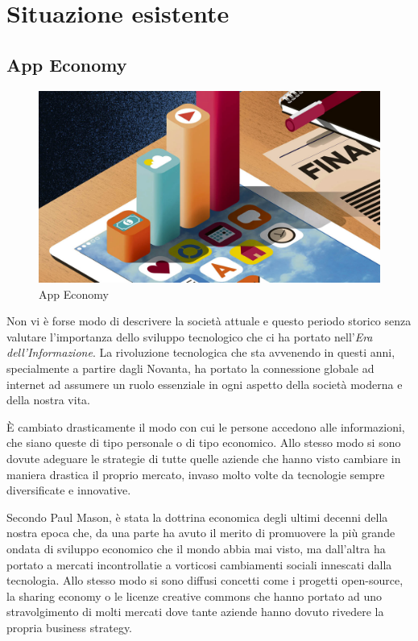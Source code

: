 \section{Situazione esistente}

\subsection{App Economy}
  
\begin{figure}[h!]
  \includegraphics[width=\linewidth]{images/The-App-Economy.jpg}
  \caption{App Economy}
  \label{fig:appEconomy1}
\end{figure}
  
Non vi è forse modo di descrivere la società attuale e questo periodo storico senza valutare l'importanza dello sviluppo tecnologico che ci ha portato nell'\textit{Era dell'Informazione}.
La rivoluzione tecnologica che sta avvenendo in questi anni, specialmente a partire dagli Novanta, ha portato la connessione globale ad internet ad assumere un ruolo essenziale in ogni aspetto della società moderna e della nostra vita.

È cambiato drasticamente il modo con cui le persone accedono alle informazioni, che siano queste di tipo personale o di tipo economico.
Allo stesso modo si sono dovute adeguare le strategie di tutte quelle aziende che hanno visto cambiare in maniera drastica il proprio mercato, invaso molto volte da tecnologie sempre diversificate e innovative.

Secondo Paul Mason, è stata la dottrina economica degli ultimi decenni della nostra epoca che, da una parte ha avuto il merito di promuovere la più grande ondata di sviluppo economico che il mondo abbia mai visto, ma dall’altra ha portato a mercati incontrollatie a vorticosi cambiamenti sociali innescati dalla tecnologia.
Allo stesso modo si sono diffusi concetti come i progetti open-source, la sharing economy o le licenze creative commons che hanno portato ad uno stravolgimento di molti mercati dove tante aziende hanno dovuto rivedere la propria business strategy. \autocite{POSTCAPITALISMO}

